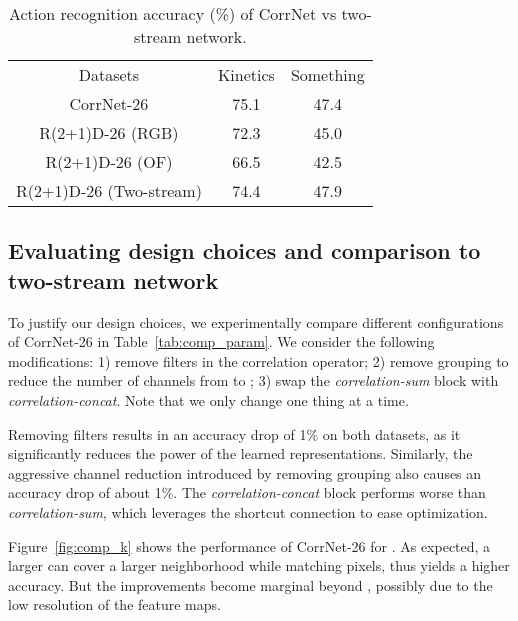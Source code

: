 \documentclass[10pt,twocolumn,letterpaper]{article}
\begin{document}
\begin{table}[t]
\centering
    \begin{tabular}{c|c|c}
        \hline
       Datasets  &   Kinetics  &  Something \\
        \shline
        CorrNet-26 & 75.1 & 47.4 \\\hline \hline
        R(2+1)D-26 (RGB) & 72.3 & 45.0 \\
        R(2+1)D-26 (OF) & 66.5 & 42.5  \\
       R(2+1)D-26 (Two-stream)  & 74.4 & 47.9 \\ \hline
    \end{tabular} 
\caption{Action recognition accuracy (\%) of CorrNet vs two-stream network.}
\label{tab:comp_two_stream}
\end{table}

\subsection{Evaluating design choices and comparison to two-stream network} \label{sec:ablation_and_two_stream}

To justify our design choices, we experimentally compare different configurations of CorrNet-26 in Table~\ref{tab:comp_param}. We consider the following modifications: 
1) remove filters in the correlation operator; 2) remove grouping to reduce the number of channels from  to ; 3) swap the \textit{correlation-sum} block with \textit{correlation-concat}. Note that we only change one thing at a time.

Removing filters results in an accuracy drop of 1\% on both datasets, as it significantly reduces the power of the learned representations. Similarly, the aggressive channel reduction introduced by removing grouping also causes an accuracy drop of about 1\%. 
The \textit{correlation-concat} block performs worse than \textit{correlation-sum}, which leverages the shortcut connection to ease optimization.

Figure~\ref{fig:comp_k} shows the performance of CorrNet-26 for . As expected, a larger  can cover a larger neighborhood while matching pixels, thus yields a higher accuracy. But the improvements become marginal beyond , possibly due to the low resolution of the feature maps.
\end{document}
